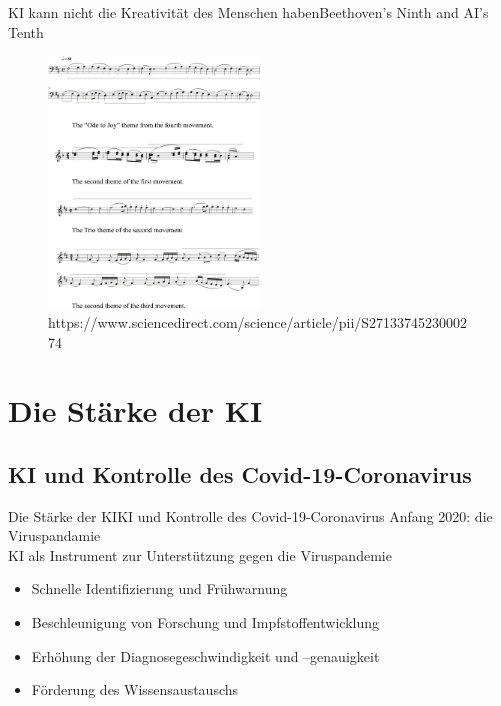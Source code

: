 \documentclass[169,9pt]{beamer}
\begin{document}
\begin{frame}{KI kann nicht die Kreativität des Menschen haben}{Beethoven's Ninth and AI's Tenth}
    \begin{figure}[h]
    \centering
    \includegraphics[width=0.5\textwidth]{BethovenNoten.jpg}
    \caption{\smaller \smaller https://www.sciencedirect.com/science/article/pii/S2713374523000274}
    \label{fig:my_label}
\end{figure}
\end{frame}

\section{Die Stärke der KI}
\subsection{KI und Kontrolle des Covid-19-Coronavirus}

\begin{frame}{Die Stärke der KI}{KI und Kontrolle des Covid-19-Coronavirus}
Anfang 2020: die Viruspandamie\\
KI als Instrument zur Unterstützung gegen die Viruspandemie\\
\begin{itemize}
    \item Schnelle Identifizierung und Frühwarnung
    \item Beschleunigung von Forschung und Impfstoffentwicklung
    \item Erhöhung der Diagnosegeschwindigkeit und –genauigkeit
    \item Förderung des Wissensaustauschs
\end{itemize}
\end{frame}
\end{document}
